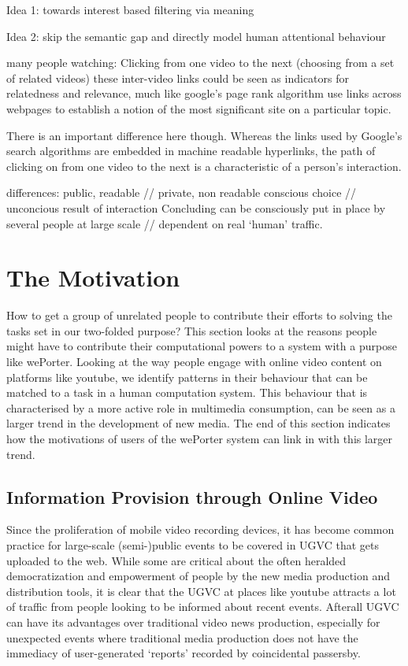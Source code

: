 Idea 1: towards interest based filtering via meaning

Idea 2: skip the semantic gap and directly model human attentional behaviour



many people watching:
Clicking from one video to the next (choosing from a set of related videos)
these inter-video links could be seen as indicators for relatedness and relevance, much like google's page rank algorithm use links across webpages to establish a notion of the most significant site on a particular topic. 

There is an important difference here though. Whereas the links used by Google's search algorithms are embedded in machine readable hyperlinks, the path of clicking on from one video to the next is a characteristic of a person's interaction. 

differences:
	public, readable // private, non readable
	conscious choice // unconcious result of interaction
	Concluding
		can be consciously put in place by several people at large scale // dependent on real `human' traffic.
		

\section{The Motivation}

How to get a group of unrelated people to contribute their efforts to solving the tasks set in our two-folded purpose? This section looks at the reasons people might have to contribute their computational powers to a system with a purpose like wePorter. Looking at the way people engage with online video content on platforms like youtube, we identify patterns in their behaviour that can be matched to a task in a human computation system. This behaviour that is characterised by a more active role in multimedia consumption, can be seen as a larger trend in the development of new media. The end of this section indicates how the motivations of users of the wePorter system can link in with this larger trend. 

\subsection{Information Provision through Online Video}

Since the proliferation of mobile video recording devices, it has become common practice for large-scale (semi-)public events to be covered in UGVC that gets uploaded to the web. While some are critical\cite{Jonsson:2011fh} about the often heralded democratization and empowerment of people by the new media production and distribution tools, it is clear that the UGVC at places like youtube attracts a lot of traffic from people looking to be informed about recent events. Afterall UGVC can have its advantages over traditional video news production, especially for unexpected events where traditional media production does not have the immediacy of user-generated `reports' recorded by coincidental passersby. 

